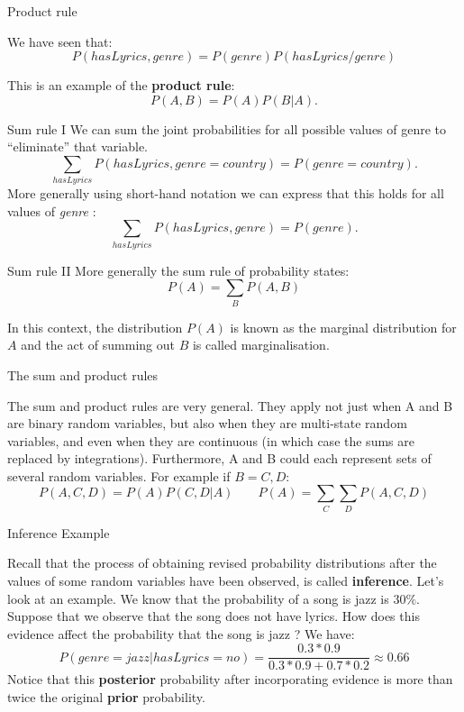 \documentclass[12pt]{beamer}
\begin{document}
\begin{frame}{Product rule}

  We have seen that:
  \[
  P(hasLyrics, genre) = P(genre)P(hasLyrics/genre)
  \]

  This is an example of the {\bf product rule}:
  \[
  P(A, B) = P(A) P(B | A). 
  \]
\end{frame}

\begin{frame}{Sum rule I}
  We can sum the joint probabilities for all possible values of genre
  to ``eliminate'' that variable. 
  \[
  \sum_{hasLyrics} P(hasLyrics, genre = country) = P(genre = country). 
  \]
  More generally using short-hand notation we can express that this
  holds for all values of {\it genre} :
  \[
  \sum_{hasLyrics} P(hasLyrics, genre) = P(genre). 
  \]  
\end{frame}


\begin{frame}{Sum rule II}
More generally the sum rule of probability states: 
  \[
  P(A) = \sum_{B} P(A, B)
  \]


  In this context, the distribution $P(A)$ is known as the marginal
  distribution for $A$ and the act of summing out $B$ is called
  marginalisation.
  
\end{frame}


\begin{frame}{The sum and product rules} 

  The sum and product rules are very general. They apply not just when
  A and B are binary random variables, but also when they are
  multi-state random variables, and even when they are continuous (in
  which case the sums are replaced by integrations). Furthermore, A
  and B could each represent sets of several random variables. For example if $B={C,D}$:
  \[
   P(A, C, D) = P(A) P(C, D | A) 
   \;\;\;\;\;\;\;
    P(A) =\sum_C \sum_D P(A, C, D)
  \]
\end{frame}

\begin{frame}{Inference Example}

    
Recall that the process of obtaining revised probability distributions
after the values of some random variables have been observed, is
called {\bf inference}. Let's look at an example. We know that the
probability of a song is jazz is $30\%$. Suppose that we observe that
the song does not have lyrics. How does this evidence affect the
probability that the song is jazz ? We have:
\[
P(genre = jazz | hasLyrics = no) = \frac{0.3 * 0.9}{0.3 * 0.9 + 0.7 * 0.2} \approx 0.66 
\]
Notice that this {\bf posterior} probability after incorporating evidence is more than twice the original {\bf prior} probability. 
  

\end{frame}
\end{document}
